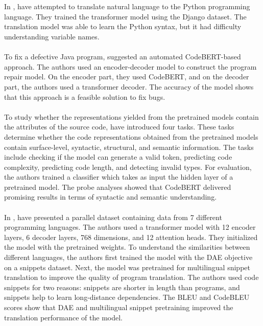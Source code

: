\\\\
In \cite{shah2021natural}, \citeauthor{shah2021natural} have attempted to translate natural language to the Python programming language. They trained the transformer model using the Django dataset. The translation model was able to learn the Python syntax, but it had difficulty understanding variable names.
\\\\
To fix a defective Java program, \textcite{mashhadi2021applying} suggested an automated CodeBERT-based approach. The authors used an encoder-decoder model to construct the program repair model. On the encoder part, they used CodeBERT, and on the decoder part, the authors used a transformer decoder. The accuracy of the model shows that this approach is a feasible solution to fix bugs.
\\\\
To study whether the representations yielded from the pretrained models contain the attributes of the source code, \textcite{karmakar2021pre} have introduced four tasks. These tasks determine whether the code representations obtained from the pretrained models contain surface-level, syntactic, structural, and semantic information. The tasks include checking if the model can generate a valid token, predicting code complexity, predicting code length, and detecting invalid types. For evaluation, the authors trained a classifier which takes as input the hidden layer of a pretrained model. The probe analyses showed that CodeBERT delivered promising results in terms of syntactic and semantic understanding.
\\\\
In \cite{zhu2022multilingual}, \citeauthor{zhu2022multilingual} have presented a parallel dataset containing data from 7 different programming languages. The authors used a transformer model with 12 encoder layers, 6 decoder layers, 768 dimensions, and 12 attention heads. They initialized the model with the pretrained weights. To understand the similarities between different languages, the authors first trained the model with the DAE objective on a snippets dataset. Next, the model was pretrained for multilingual snippet translation to improve the quality of program translation. The authors used code snippets for two reasons: snippets are shorter in length than programs, and snippets help to learn long-distance dependencies. The BLEU and CodeBLEU scores show that DAE and multilingual snippet pretraining improved the translation performance of the model.

